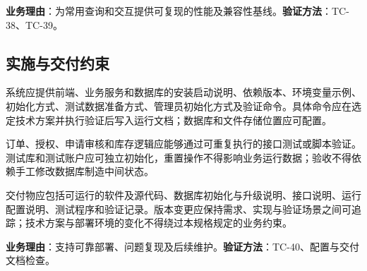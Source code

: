 {\bfseries 业务理由}：为常用查询和交互提供可复现的性能及兼容性基线。{\bfseries 验证方法}：TC-38、TC-39。

\subsection{实施与交付约束}\label{sec:36-实施与交付约束}


系统应提供前端、业务服务和数据库的安装启动说明、依赖版本、环境变量示例、初始化方式、测试数据准备方式、管理员初始化方式及验证命令。具体命令应在选定技术方案并执行验证后写入运行文档；数据库和文件存储位置应可配置。

订单、授权、申请审核和库存逻辑应能够通过可重复执行的接口测试或脚本验证。测试库和测试账户应可独立初始化，重置操作不得影响业务运行数据；验收不得依赖手工修改数据库制造中间状态。

交付物应包括可运行的软件及源代码、数据库初始化与升级说明、接口说明、运行配置说明、测试程序和验证记录。版本变更应保持需求、实现与验证场景之间可追踪；技术方案与部署环境的变化不得绕过本规格规定的业务约束。

{\bfseries 业务理由}：支持可靠部署、问题复现及后续维护。{\bfseries 验证方法}：TC-40、配置与交付文档检查。
